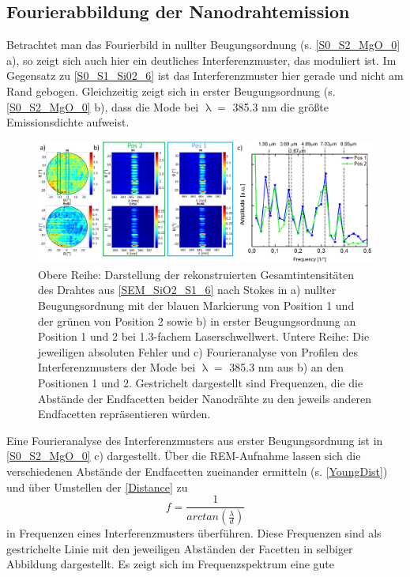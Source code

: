 \subsection{Fourierabbildung der Nanodrahtemission} Betrachtet man das
Fourierbild in nullter Beugungsordnung (s. \autoref{S0_S2_MgO_0} a), so zeigt
sich auch hier ein deutliches Interferenzmuster, das moduliert ist. Im Gegensatz
zu \autoref{S0_S1_Si02_6} ist das Interferenzmuster hier gerade und nicht am
Rand gebogen. Gleichzeitig zeigt sich in erster Beugungsordnung (s.
\autoref{S0_S2_MgO_0} b), dass die Mode bei $\uplambda = $ 385.3 nm die größte
Emissionsdichte aufweist. \begin{figure}[h] \centering
\includegraphics[width=1\textwidth]{Bilder/MgO/S0_S2_MgO_0} \caption{Obere
Reihe: Darstellung der rekonstruierten Gesamtintensitäten des Drahtes aus
\autoref{SEM_SiO2_S1_6} nach Stokes in a) nullter Beugungsordnung mit der blauen
Markierung von Position 1 und der grünen von Position 2 sowie b) in erster
Beugungsordnung an Position 1 und 2 bei 1.3-fachem Laserschwellwert. Untere
Reihe: Die jeweiligen absoluten Fehler und c) Fourieranalyse von Profilen des
Interferenzmusters der Mode bei $\uplambda=$ 385.3 nm aus b) an den Positionen 1
und 2. Gestrichelt dargestellt sind Frequenzen, die die Abstände der Endfacetten
beider Nanodrähte zu den jeweils anderen Endfacetten repräsentieren würden.}
\label{S0_S2_MgO_0} \end{figure}Eine Fourieranalyse des Interferenzmusters aus
erster Beugungsordnung ist in \autoref{S0_S2_MgO_0} c) dargestellt. Über die
REM-Aufnahme lassen sich die verschiedenen Abstände der Endfacetten zueinander
ermitteln (s. \autoref{YoungDist}) und über Umstellen der \autoref{Distance} zu
\begin{equation} f=\frac{1}{arctan\left(\frac{\lambda}{d}\right)} \end{equation}
in Frequenzen eines Interferenzmusters überführen. Diese Frequenzen sind als
gestrichelte Linie mit den jeweiligen Abständen der Facetten in selbiger
Abbildung dargestellt. Es zeigt sich im Frequenzspektrum eine gute
